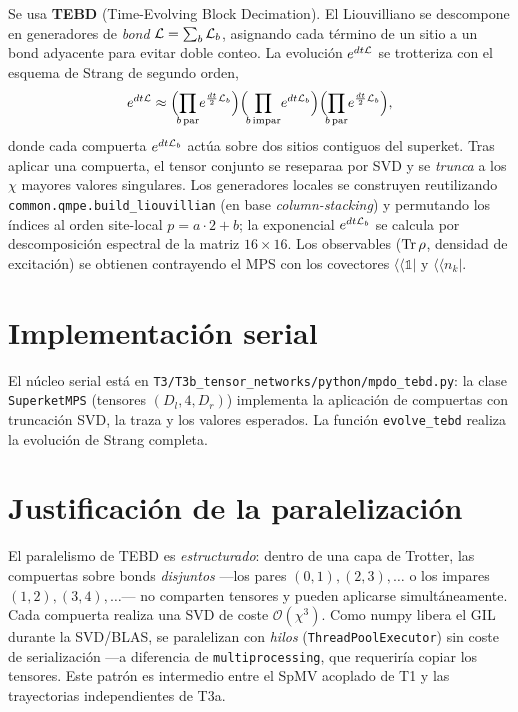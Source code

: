 Se usa \textbf{TEBD} (Time-Evolving Block Decimation). El Liouvilliano se
descompone en generadores de \emph{bond} $\mathcal{L}=\sum_b \mathcal{L}_b$, asignando cada
término de un sitio a un bond adyacente para evitar doble conteo. La evolución
$e^{dt\mathcal{L}}$ se trotteriza con el esquema de Strang de segundo orden,
\begin{equation}
    e^{dt\Lop}\approx
    \Big(\!\!\prod_{b\,\text{par}}\! e^{\frac{dt}{2}\Lop_b}\Big)
    \Big(\!\!\prod_{b\,\text{impar}}\! e^{dt\Lop_b}\Big)
    \Big(\!\!\prod_{b\,\text{par}}\! e^{\frac{dt}{2}\Lop_b}\Big),
\end{equation}
donde cada compuerta $e^{dt\mathcal{L}_b}$ actúa sobre dos sitios contiguos del superket.
Tras aplicar una compuerta, el tensor conjunto se reseparaa por SVD y se
\emph{trunca} a los $\chi$ mayores valores singulares. Los generadores locales se
construyen reutilizando \texttt{common.qmpe.build\_liouvillian} (en base
\emph{column-stacking}) y permutando los índices al orden site-local $p=a\cdot2+b$;
la exponencial $e^{dt\mathcal{L}_b}$ se calcula por descomposición espectral de la matriz
$16\times16$. Los observables ($\Tr\rho$, densidad de excitación) se obtienen
contrayendo el MPS con los covectores $\langle\!\langle\mathbb{1}|$ y
$\langle\!\langle n_k|$.

\section{Implementación serial}

El núcleo serial está en \texttt{T3/T3b\_tensor\_networks/python/mpdo\_tebd.py}: la
clase \texttt{SuperketMPS} (tensores $(D_l,4,D_r)$) implementa la aplicación de
compuertas con truncación SVD, la traza y los valores esperados. La función
\texttt{evolve\_tebd} realiza la evolución de Strang completa.

\section{Justificación de la paralelización}

El paralelismo de TEBD es \emph{estructurado}: dentro de una capa de Trotter, las
compuertas sobre bonds \emph{disjuntos} ---los pares $(0,1),(2,3),\dots$ o los
impares $(1,2),(3,4),\dots$--- no comparten tensores y pueden aplicarse
simultáneamente. Cada compuerta realiza una SVD de coste $\mathcal{O}(\chi^3)$.
Como numpy libera el GIL durante la SVD/BLAS, se paralelizan con \emph{hilos}
(\texttt{ThreadPoolExecutor}) sin coste de serialización ---a diferencia de
\texttt{multiprocessing}, que requeriría copiar los tensores. Este patrón es
intermedio entre el SpMV acoplado de T1 y las trayectorias independientes de T3a.


